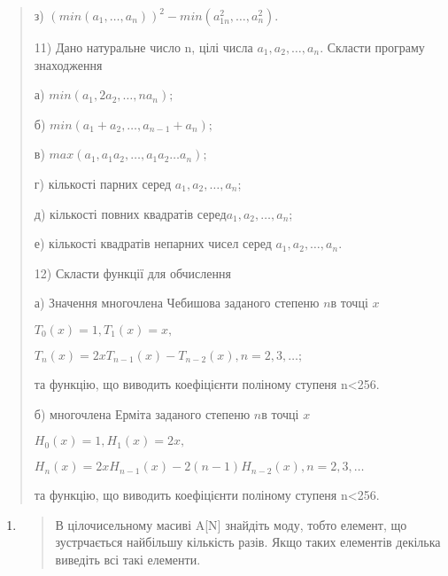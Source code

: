 \documentclass[]{article}
\begin{document}
\begin{quote}
з)
\({(min(a_{1},\ldots,a_{n}))}^{2} - min(a_{1n}^{2},\ldots,a_{n}^{2}).\)

11) Дано натуральне число n, цілі числа \(a_{1},a_{2},\ldots,a_{n}.\)
Скласти програму знаходження

а) \(min(a_{1},2a_{2},\ldots,na_{n});\)

б) \(min(a_{1} + a_{2},\ldots,a_{n - 1} + a_{n});\)

в) \(max(a_{1},a_{1}a_{2},\ldots,a_{1}a_{2}\ldots a_{n});\)

г) кількості парних серед \(a_{1},a_{2},\ldots,a_{n}\);

д) кількості повних квадратів серед\(a_{1},a_{2},\ldots,a_{n}\);

е) кількості квадратів непарних чисел серед
\(a_{1},a_{2},\ldots,a_{n}.\)

12) Скласти функції для обчислення

а) Значення многочлена Чебишова заданого степеню \(n\)в точці \(x\)

\(T_{0}(x) = 1,T_{1}(x) = x,\)

\(T_{n}(x) = 2xT_{n - 1}(x) - T_{n - 2}(x),n = 2,3,\ldots;\)

та функцію, що виводить коефіцієнти поліному ступеня n\textless{}256.

б) многочлена Ерміта заданого степеню \(n\)в точці \(x\)

\(H_{0}(x) = 1,H_{1}(x) = 2x,\)

\(H_{n}(x) = 2xH_{n - 1}(x) - 2(n - 1)H_{n - 2}(x),n = 2,3,\ldots\)

та функцію, що виводить коефіцієнти поліному ступеня n\textless{}256.
\end{quote}

\begin{enumerate}
\def\labelenumi{\arabic{enumi})}
\setcounter{enumi}{12}
\item
  \begin{quote}
  В цілочисельному масиві A{[}N{]} знайдіть моду, тобто елемент, що
  зустрчається найбільшу кількість разів. Якщо таких елементів декілька
  виведіть всі такі елементи.
  \end{quote}
\end{enumerate}
\end{document}
